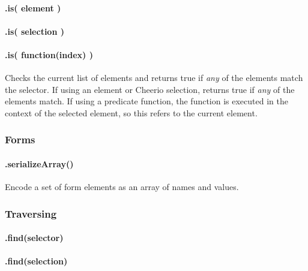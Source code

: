 \paragraph*{.is( element )}

\paragraph*{.is( selection )}

\paragraph*{.is( function(index) )}

Checks the current list of elements and returns {\ttfamily true} if {\itshape any} of the elements match the selector. If using an element or Cheerio selection, returns {\ttfamily true} if {\itshape any} of the elements match. If using a predicate function, the function is executed in the context of the selected element, so {\ttfamily this} refers to the current element.

\subsubsection*{Forms}

\paragraph*{.serialize\+Array()}

Encode a set of form elements as an array of names and values.




\subsubsection*{Traversing}

\paragraph*{.find(selector)}

\paragraph*{.find(selection)}

